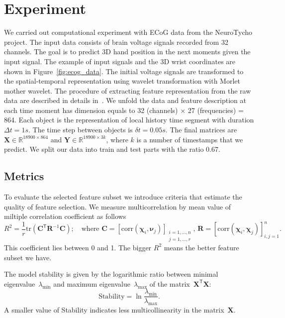 \documentclass[12pt,twoside]{article}
\theoremstyle{definition}
\newcommand{\bY}{\mathbf{Y}}
\newcommand{\bX}{\mathbf{X}}
\newcommand{\bC}{\mathbf{C}}
\newcommand{\bbR}{\mathbb{R}}
\newcommand{\T}{\mathsf{T}}
\newcommand{\bchi}{\boldsymbol{\chi}}
\newcommand{\bnu}{\boldsymbol{\nu}}
\begin{document}
\newpage
\section{Experiment}

We carried out computational experiment with ECoG data from the NeuroTycho project. The input data consists of brain voltage signals recorded from 32 channels.
The goal is to predict 3D hand position in the next moments given the input signal.
The example of input signals and the 3D wrist coordinates are shown in Figure~\ref{fig:ecog_data}.
The initial voltage signals are transformed to the spatial-temporal representation using wavelet transformation with Morlet mother wavelet.
The procedure of extracting feature representation from the raw data are described in details in~\cite{chao2010long,eliseyev2016penalized}.
We unfold the data and feature description at each time moment has dimension equals to 32 (channels) $\times$ 27 (frequencies) = 864.
Each object is the representation of local history time segment with duration $\Delta t = 1s$. The time step between objects is $\delta t =  0.05s$.
The final matrices are $\bX \in \bbR^{18900 \times 864}$ and $\bY \in \bbR^{18900 \times 3k}$, where $k$ is a number of timestamps that we predict.
We split our data into train and test parts with the ratio 0.67.

\subsection{Metrics}

To evaluate the selected feature subset we introduce criteria that estimate the quality of feature selection.
We measure multicorrelation by mean value of miltiple correlation coefficient as follows
\begin{equation*}
R^2 = \frac{1}{r} \text{tr} \left( \bC^{\T} \mathbf{R}^{-1} \bC \right); \quad \text{where }\bC = [ \text{corr}(\bchi_i, \bnu_j)]_{\substack{i=1, \dots, n \\ j=1, \dots, r}}, \, \mathbf{R} = [ \text{corr}(\bchi_i, \bchi_j)]_{i, j = 1}^n.
\end{equation*}
This coefficient lies between 0 and 1. The bigger $R^2$ means the better feature subset we have.

The model stability is given by the logarithmic ratio between minimal eigenvalue~$\lambda_{\min}$ and maximum eigenvalue~$\lambda_{\max}$ of the matrix~$\bX^{\T} \bX$:
\begin{equation*}
\text{Stability} = \ln \frac{\lambda_{\min}}{\lambda_{\max}}.
\end{equation*}
A smaller value of Stability indicates less multicollinearity in the matrix~$\bX$.
\end{document}
